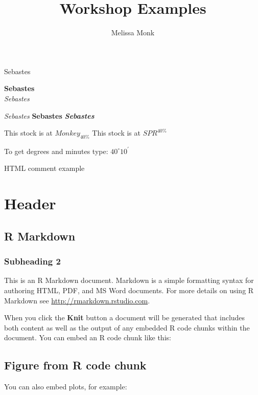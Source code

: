 \documentclass[]{article}
\title{Workshop Examples}
\author{Melissa Monk}
\date{}
\begin{document}
\maketitle

{
\setcounter{tocdepth}{2}
\tableofcontents
}
Sebastes

\textbf{Sebastes}\\
\emph{Sebastes}

\emph{Sebastes} \textbf{Sebastes} \textbf{\emph{Sebastes}}

This stock is at \(Monkey_{40\%}\) This stock is at \(SPR^{40\%}\)

To get degrees and minutes type: \(40^\circ 10^\prime\)

HTML comment example

\section{Header}\label{header}

\subsection{R Markdown}\label{r-markdown}

\subsubsection{Subheading 2}\label{subheading-2}

This is an R Markdown document. Markdown is a simple formatting syntax
for authoring HTML, PDF, and MS Word documents. For more details on
using R Markdown see \url{http://rmarkdown.rstudio.com}.

When you click the \textbf{Knit} button a document will be generated
that includes both content as well as the output of any embedded R code
chunks within the document. You can embed an R code chunk like this:

\subsection{Figure from R code chunk}\label{figure-from-r-code-chunk}

You can also embed plots, for example:
\end{document}
